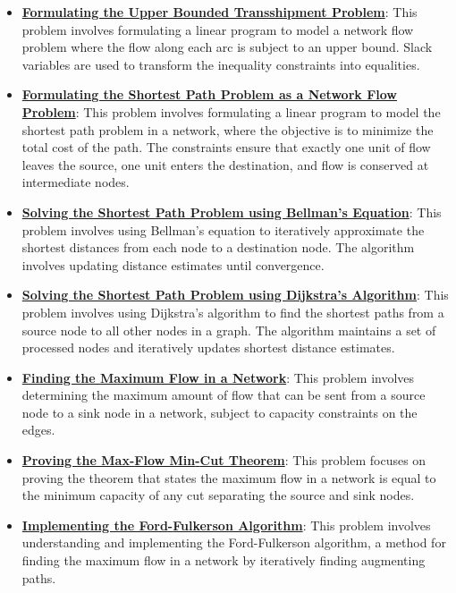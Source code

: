 \documentclass{article}%
\begin{document}
\begin{itemize}[leftmargin=*]
\item \href{https://www.math.purdue.edu/~yipn/421/2024-11-14-NetAppls.pdf#page=9}{\textbf{Formulating the Upper Bounded Transshipment Problem}}: This problem involves formulating a linear program to model a network flow problem where the flow along each arc is subject to an upper bound. Slack variables are used to transform the inequality constraints into equalities.%
\item \href{https://www.math.purdue.edu/~yipn/421/2024-11-14-NetAppls.pdf#page=13}{\textbf{Formulating the Shortest Path Problem as a Network Flow Problem}}: This problem involves formulating a linear program to model the shortest path problem in a network, where the objective is to minimize the total cost of the path. The constraints ensure that exactly one unit of flow leaves the source, one unit enters the destination, and flow is conserved at intermediate nodes.%
\item \href{https://www.math.purdue.edu/~yipn/421/2024-11-14-NetAppls.pdf#page=16}{\textbf{Solving the Shortest Path Problem using Bellman's Equation}}: This problem involves using Bellman's equation to iteratively approximate the shortest distances from each node to a destination node. The algorithm involves updating distance estimates until convergence.%
\item \href{https://www.math.purdue.edu/~yipn/421/2024-11-14-NetAppls.pdf#page=20}{\textbf{Solving the Shortest Path Problem using Dijkstra's Algorithm}}: This problem involves using Dijkstra's algorithm to find the shortest paths from a source node to all other nodes in a graph. The algorithm maintains a set of processed nodes and iteratively updates shortest distance estimates.%
\item \href{https://www.math.purdue.edu/~yipn/421/2024-11-19-MaxFlowMinCut.pdf#page=1}{\textbf{Finding the Maximum Flow in a Network}}: This problem involves determining the maximum amount of flow that can be sent from a source node to a sink node in a network, subject to capacity constraints on the edges.%
\item \href{https://www.math.purdue.edu/~yipn/421/2024-11-19-MaxFlowMinCut.pdf#page=8}{\textbf{Proving the Max{-}Flow Min{-}Cut Theorem}}: This problem focuses on proving the theorem that states the maximum flow in a network is equal to the minimum capacity of any cut separating the source and sink nodes.%
\item \href{https://www.math.purdue.edu/~yipn/421/2024-11-19-MaxFlowMinCut.pdf#page=12}{\textbf{Implementing the Ford{-}Fulkerson Algorithm}}: This problem involves understanding and implementing the Ford-Fulkerson algorithm, a method for finding the maximum flow in a network by iteratively finding augmenting paths.%

\end{itemize}
\end{document}
